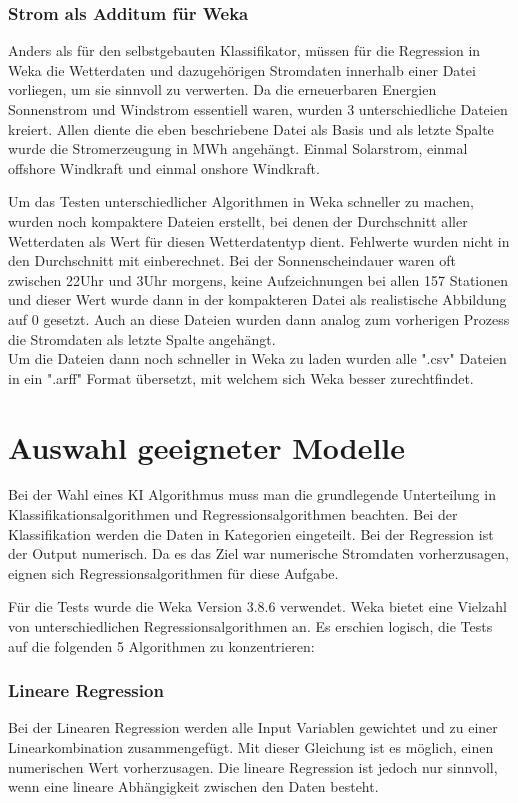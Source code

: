 \documentclass[letterpaper]{article} %
\begin{document}
        \subsubsection*{Strom als Additum für Weka}
            Anders als für den selbstgebauten Klassifikator, müssen für die Regression in Weka die Wetterdaten und dazugehörigen Stromdaten innerhalb einer Datei vorliegen, um sie sinnvoll zu verwerten. Da die erneuerbaren Energien Sonnenstrom und Windstrom essentiell waren, wurden 3 unterschiedliche Dateien kreiert. Allen diente die eben beschriebene Datei als Basis und als letzte Spalte wurde die Stromerzeugung in MWh angehängt. Einmal Solarstrom, einmal offshore Windkraft und einmal onshore Windkraft.

            Um das Testen unterschiedlicher Algorithmen in Weka schneller zu machen, wurden noch kompaktere Dateien erstellt, bei denen der Durchschnitt aller Wetterdaten als Wert für diesen Wetterdatentyp dient. Fehlwerte wurden nicht in den Durchschnitt mit einberechnet. Bei der Sonnenscheindauer waren oft zwischen 22Uhr und 3Uhr morgens, keine Aufzeichnungen bei allen 157 Stationen und dieser Wert wurde dann in der kompakteren Datei als realistische Abbildung auf 0 gesetzt.
            Auch an diese Dateien wurden dann analog zum vorherigen Prozess die Stromdaten als letzte Spalte angehängt.
        \\

        Um die Dateien dann noch schneller in Weka zu laden wurden alle ".csv" Dateien in ein ".arff" Format übersetzt, mit welchem sich Weka besser zurechtfindet.


\section{Auswahl geeigneter Modelle}
    Bei der Wahl eines KI Algorithmus muss man die grundlegende Unterteilung in Klassifikationsalgorithmen und Regressionsalgorithmen beachten. Bei der Klassifikation werden die Daten in Kategorien eingeteilt. Bei der Regression ist der Output numerisch. Da es das Ziel war numerische Stromdaten vorherzusagen, eignen sich Regressionsalgorithmen für diese Aufgabe.
    
    Für die Tests wurde die Weka Version 3.8.6 verwendet.
    Weka bietet eine Vielzahl von unterschiedlichen Regressionsalgorithmen an. Es erschien logisch, die Tests auf die folgenden 5 Algorithmen zu konzentrieren:
    
    \subsubsection*{Lineare Regression}
        Bei der Linearen Regression werden alle Input Variablen gewichtet und zu einer Linearkombination zusammengefügt. Mit dieser Gleichung ist es möglich, einen numerischen Wert vorherzusagen. Die lineare Regression ist jedoch nur sinnvoll, wenn eine lineare Abhängigkeit zwischen den Daten besteht.
    
\end{document}
